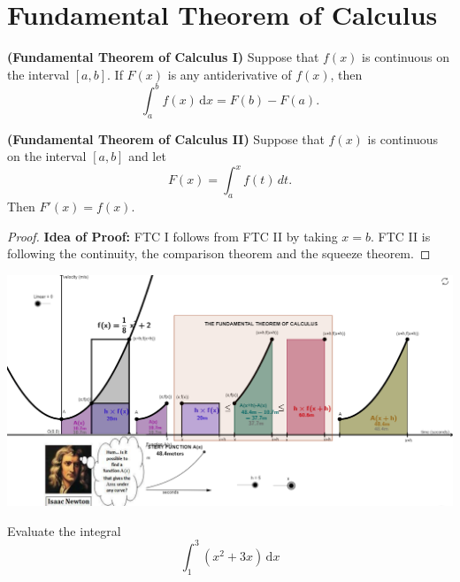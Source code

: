 
\hypertarget{fundamental-theorem-of-calculus}{%
\section{Fundamental Theorem of
Calculus}\label{fundamental-theorem-of-calculus}}

\begin{theorem}

\textbf{(Fundamental Theorem of Calculus I)} Suppose that \(f(x)\) is
continuous on the interval \([a,b]\). If \(F(x)\) is any antiderivative
of \(f(x)\), then \[\int_a^b f(x)\,\mathrm{d}x = F(b)-F(a).\]

\end{theorem}

\begin{theorem}

\textbf{(Fundamental Theorem of Calculus II)} Suppose that \(f(x)\) is
continuous on the interval \([a,b]\) and let \[F(x)=\int_a^x f(t)\,dt.\]
Then \(F'(x)=f(x)\).

\end{theorem}

\begin{proof}

\textbf{Idea of Proof:} FTC I follows from FTC II by taking \(x=b\). FTC
II is following the continuity, the comparison theorem and the squeeze
theorem.

\end{proof}

\begin{fullwidth}
  \centering
  \href{https://www.geogebra.org/m/wdUED3wy}{\includegraphics[width=0.8\linewidth]{img/image-20200427155419418.png}}
\end{fullwidth}


\begin{example}

Evaluate the integral \[ \int_1^3 (x^2+3x)\,\mathrm{d}x\]

\end{example}
\vspace*{6\baselineskip}

